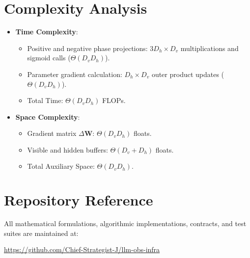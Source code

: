\documentclass[11pt,a4paper]{article}
\theoremstyle{definition}
\begin{document}
\section{Complexity Analysis}
\begin{itemize}
    \item \textbf{Time Complexity}:
    \begin{itemize}
        \item Positive and negative phase projections: $3 D_h \times D_v$ multiplications and sigmoid calls ($\Theta(D_v D_h)$).
        \item Parameter gradient calculation: $D_h \times D_v$ outer product updates ($\Theta(D_v D_h)$).
        \item Total Time: $\Theta(D_v D_h)$ FLOPs.
    \end{itemize}
    \item \textbf{Space Complexity}:
    \begin{itemize}
        \item Gradient matrix $\Delta \mathbf{W}$: $\Theta(D_v D_h)$ floats.
        \item Visible and hidden buffers: $\Theta(D_v + D_h)$ floats.
        \item Total Auxiliary Space: $\Theta(D_v D_h)$.
    \end{itemize}
\end{itemize}

\section{Repository Reference}
All mathematical formulations, algorithmic implementations, contracts, and test suites are maintained at:
\begin{center}
\url{https://github.com/Chief-Strategist-J/llm-obs-infra}
\end{center}
\end{document}

